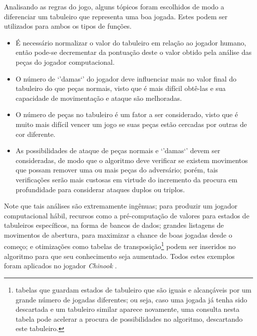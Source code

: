 \documentclass{article}
\begin{document}
\begin{enumerate}[label=\textbf{\arabic*})]
    Analisando as regras do jogo, alguns tópicos foram escolhidos de modo a
    diferenciar um tabuleiro que representa uma boa jogada. Estes podem ser
    utilizados para ambos os tipos de funções.

    \begin{itemize}

        \item É necessário normalizar o valor do tabuleiro em relação ao
        jogador humano, então pode-se decrementar da pontuação deste o valor
        obtido pela análise das peças do jogador computacional.

        \item O número de `'damas`' do jogador deve influenciar mais no valor
        final do tabuleiro do que peças normais, visto que é mais difícil
        obtê-las e sua capacidade de movimentação e ataque são melhoradas.

        \item O número de peças no tabuleiro é um fator a ser considerado,
        visto que é muito mais difícil vencer um jogo se suas peças estão
        cercadas por outras de cor diferente.

        \item As possibilidades de ataque de peças normais e `'damas`' devem
        ser consideradas, de modo que o algoritmo deve verificar se existem
        movimentos que possam remover uma ou mais peças do adversário; porém,
        tais verificações serão mais custosas em virtude do incremento da
        procura em profundidade para considerar ataques duplos ou triplos.

    \end{itemize}

    Note que tais análises são extremamente ingênuas; para produzir um
    jogador computacional hábil, recursos como a pré-computação de valores
    para estados de tabuleiros específicos, na forma de bancos de dados;
    grandes listagens de movimentos de abertura, para maximizar a chance de
    boas jogadas desde o começo; e otimizações como tabelas de
    transposição\footnote{tabelas que guardam estados de tabuleiro que são
    iguais e alcançáveis por um grande número de jogadas diferentes;
    ou seja, caso uma jogada já tenha sido descartada e um tabuleiro similar
    aparece novamente, uma consulta nesta tabela pode acelerar a procura de
    possibilidades no algoritmo, descartando este tabuleiro.} podem ser
    inseridos no algoritmo para que seu conhecimento seja aumentado.
    Todos estes exemplos foram aplicados no jogador \textit{Chinook}
    \cite{Schaeffer1989}.

\end{enumerate}



\end{document}
